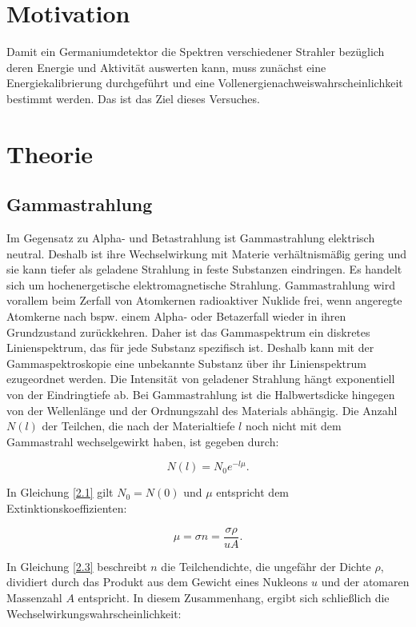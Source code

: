 \section{Motivation}
Damit ein Germaniumdetektor die Spektren verschiedener Strahler bezüglich deren
Energie und Aktivität auswerten kann, muss zunächst eine Energiekalibrierung 
durchgeführt und
eine Vollenergienachweiswahrscheinlichkeit bestimmt werden. 
Das ist das Ziel dieses Versuches.

\section{Theorie}
\label{sec:Theorie}

\subsection{Gammastrahlung}
Im Gegensatz zu Alpha- und Betastrahlung ist Gammastrahlung elektrisch neutral. 
Deshalb ist ihre Wechselwirkung mit Materie verhältnismäßig gering und sie 
kann tiefer als geladene Strahlung in feste Substanzen eindringen.
Es handelt sich um hochenergetische elektromagnetische Strahlung.
Gammastrahlung wird vorallem beim Zerfall von Atomkernen radioaktiver Nuklide frei, 
wenn angeregte Atomkerne nach bspw. einem Alpha- oder Betazerfall wieder in ihren 
Grundzustand zurückkehren.
Daher ist das Gammaspektrum ein diskretes Linienspektrum, das für jede Substanz 
spezifisch ist. Deshalb kann mit der Gammaspektroskopie eine unbekannte Substanz über 
ihr Linienspektrum ezugeordnet werden.
Die Intensität von geladener Strahlung hängt exponentiell von der 
Eindringtiefe ab. Bei Gammastrahlung ist die Halbwertsdicke hingegen 
von der Wellenlänge und der Ordnungszahl des Materials abhängig.
Die Anzahl $N(l)$ der Teilchen, die nach der Materialtiefe $l$ noch nicht mit dem 
Gammastrahl wechselgewirkt haben, ist gegeben durch:

\begin{equation}
    N(l) = N_0 e^{-l\mu}.
    \label{2.1}
\end{equation}

In Gleichung \ref{2.1} gilt $N_0 = N(0)$ und $\mu$ entspricht dem Extinktionskoeffizienten:

\begin{equation}
    \mu = \sigma n = \frac{\sigma \rho}{uA}.
    \label{2.3}
\end{equation}

In Gleichung \ref{2.3} beschreibt $n$ die Teilchendichte, die ungefähr der 
Dichte $\rho$, dividiert durch das Produkt aus dem Gewicht eines Nukleons $u$
und der atomaren Massenzahl $A$  entspricht.
In diesem Zusammenhang, ergibt sich schließlich die 
Wechselwirkungswahrscheinlichkeit:

